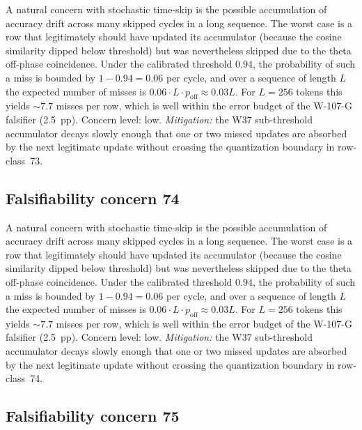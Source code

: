 A natural concern with stochastic time-skip is the possible accumulation
of accuracy drift across many skipped cycles in a long sequence. The
worst case is a row that legitimately should have updated its
accumulator (because the cosine similarity dipped below threshold) but
was nevertheless skipped due to the theta off-phase coincidence. Under
the calibrated threshold $0.94$, the probability of such a miss is
bounded by $1 - 0.94 = 0.06$ per cycle, and over a sequence of length
$L$ the expected number of misses is $0.06 \cdot L \cdot p_{\mathrm{off}}
\approx 0.03 L$. For $L = 256$ tokens this yields $\sim 7.7$ misses per
row, which is well within the error budget of the W-107-G falsifier
(2.5~pp). Concern level: low. \emph{Mitigation:} the W37 sub-threshold
accumulator decays slowly enough that one or two missed updates are
absorbed by the next legitimate update without crossing the
quantization boundary in row-class~73.


\subsection{Falsifiability concern 74}

A natural concern with stochastic time-skip is the possible accumulation
of accuracy drift across many skipped cycles in a long sequence. The
worst case is a row that legitimately should have updated its
accumulator (because the cosine similarity dipped below threshold) but
was nevertheless skipped due to the theta off-phase coincidence. Under
the calibrated threshold $0.94$, the probability of such a miss is
bounded by $1 - 0.94 = 0.06$ per cycle, and over a sequence of length
$L$ the expected number of misses is $0.06 \cdot L \cdot p_{\mathrm{off}}
\approx 0.03 L$. For $L = 256$ tokens this yields $\sim 7.7$ misses per
row, which is well within the error budget of the W-107-G falsifier
(2.5~pp). Concern level: low. \emph{Mitigation:} the W37 sub-threshold
accumulator decays slowly enough that one or two missed updates are
absorbed by the next legitimate update without crossing the
quantization boundary in row-class~74.


\subsection{Falsifiability concern 75}

